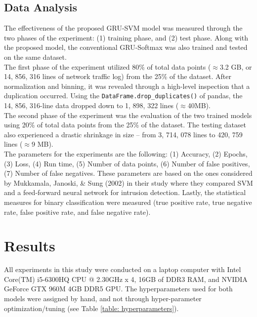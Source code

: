 \subsection{Data Analysis}
The effectiveness of the proposed GRU-SVM model was measured through the two phases of the experiment: (1) training phase, and (2) test phase. Along with the proposed model, the conventional GRU-Softmax was also trained and tested on the same dataset.\\
\indent	The first phase of the experiment utilized 80\% of total data points ($\approx$3.2 GB, or 14, 856, 316 lines of network traffic log) from the 25\% of the dataset. After normalization and binning, it was revealed through a high-level inspection that a duplication occurred. Using the \texttt{DataFrame.drop\_duplicates()} of pandas\cite{mckinney-proc-scipy-2010}, the 14, 856, 316-line data dropped down to 1, 898, 322 lines ($\approx$40MB).\\
\indent	The second phase of the experiment was the evaluation of the two trained models using 20\% of total data points from the 25\% of the dataset. The testing dataset also experienced a drastic shrinkage in size -- from 3, 714, 078 lines to 420, 759 lines ($\approx$9 MB). \\
\indent	The parameters for the experiments are the following: (1) Accuracy, (2) Epochs, (3) Loss, (4) Run time, (5) Number of data points, (6) Number of false positives, (7) Number of false negatives. These parameters are based on the ones considered by Mukkamala, Janoski, \& Sung (2002)\cite{Mukkamala} in their study where they compared SVM and a feed-forward neural network for intrusion detection. Lastly, the statistical measures for binary classification were measured (true positive rate, true negative rate, false positive rate, and false negative rate).


\section{Results}

All experiments in this study were conducted on a laptop computer with Intel Core(TM) i5-6300HQ CPU @ 2.30GHz x 4, 16GB of DDR3 RAM, and NVIDIA GeForce GTX 960M 4GB DDR5 GPU. The hyperparameters used for both models were assigned by hand, and not through hyper-parameter optimization/tuning (see Table \ref{table: hyperparameters}).

